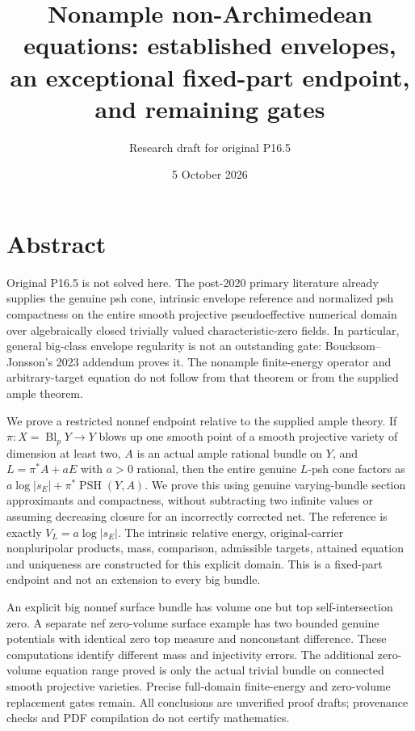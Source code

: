 \documentclass[
  10pt,
]{article}
\title{Nonample non-Archimedean equations: established envelopes, an
exceptional fixed-part endpoint, and remaining gates}
\author{Research draft for original P16.5}
\date{5 October 2026}
\begin{document}
\maketitle

\section{Abstract}\label{abstract}

Original P16.5 is not solved here. The post-2020 primary literature
already supplies the genuine psh cone, intrinsic envelope reference and
normalized psh compactness on the entire smooth projective
pseudoeffective numerical domain over algebraically closed trivially
valued characteristic-zero fields. In particular, general big-class
envelope regularity is not an outstanding gate: Boucksom--Jonsson's 2023
addendum proves it. The nonample finite-energy operator and
arbitrary-target equation do not follow from that theorem or from the
supplied ample theorem.

We prove a restricted nonnef endpoint relative to the supplied ample
theory. If \(\pi:X=\operatorname{Bl}_pY\to Y\) blows up one smooth point
of a smooth projective variety of dimension at least two, \(A\) is an
actual ample rational bundle on \(Y\), and \(L=\pi^*A+aE\) with \(a>0\)
rational, then the entire genuine \(L\)-psh cone factors as
\(a\log|s_E|+\pi^*\operatorname{PSH}(Y,A)\). We prove this using genuine
varying-bundle section approximants and compactness, without subtracting
two infinite values or assuming decreasing closure for an incorrectly
corrected net. The reference is exactly \(V_L=a\log|s_E|\). The
intrinsic relative energy, original-carrier nonpluripolar products,
mass, comparison, admissible targets, attained equation and uniqueness
are constructed for this explicit domain. This is a fixed-part endpoint
and not an extension to every big bundle.

An explicit big nonnef surface bundle has volume one but top
self-intersection zero. A separate nef zero-volume surface example has
two bounded genuine potentials with identical zero top measure and
nonconstant difference. These computations identify different mass and
injectivity errors. The additional zero-volume equation range proved is
only the actual trivial bundle on connected smooth projective varieties.
Precise full-domain finite-energy and zero-volume replacement gates
remain. All conclusions are unverified proof drafts; provenance checks
and PDF compilation do not certify mathematics.
\end{document}
